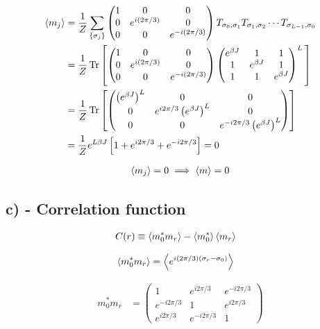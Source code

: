 \documentclass[reprint,english,notitlepage,aps,nobalancelastpage,nofootinbib]{revtex4-1}
\newcommand{\closed}[1]{\left(#1\right)}
\newcommand{\bracket}[1]{\left[#1\right]}
\newcommand{\sumstate}{\sum_{\{\sigma_j\}}}
\newcommand{\ebj}{e^{\beta J}}
\newcommand{\mj}{m_j}
\begin{document}
\begin{align*}
	\expval{\mj} &= \frac{1}{Z} \sumstate \begin{pmatrix}
		1 & 0 & 0 \\
		0 & e^{i(2\pi/3)} & 0 \\ 
		0 & 0 & e^{-i(2\pi/3)}
	\end{pmatrix} T_{\sigma_0,\sigma_1} T_{\sigma_1,\sigma_2}\cdots T_{\sigma_{L-1},\sigma_0} \\ 
	&= \frac{1}{Z} \Tr \bracket{ \begin{pmatrix}
		1 & 0 & 0 \\
		0 & e^{i(2\pi/3)} & 0 \\ 
		0 & 0 & e^{-i(2\pi/3)}
	\end{pmatrix} 
	\begin{pmatrix}
		\ebj & 1 & 1 \\ 
		1 & \ebj & 1 \\
		1 & 1 & \ebj
	\end{pmatrix}^L\,	} \\ 
	&= \frac{1}{Z} \Tr \bracket{ 
	\begin{pmatrix}
		\closed{\ebj}^L & 0 & 0 \\ 
		0 & e^{i2\pi/3}\closed{\ebj}^L & 0 \\ 
		0 & 0 & e^{-i2\pi/3}\closed{\ebj}^L
	\end{pmatrix}
	} \\ 
	&= \frac{1}{Z} e^{L\beta J}\bracket{1 + e^{i2\pi/3} + e^{-i2\pi/3}} = 0
\end{align*}

\begin{align*}
	\expval{\mj}=0 \implies \expval{m} = 0
\end{align*}

\subsection*{c) - Correlation function}

\begin{align*}
	C(r) &\equiv \expval{m_0^* m_r} - \expval{m_0^*}\expval{m_r}
\end{align*}


\begin{align*}
	\expval{m_0^* m_r} &= \expval{e^{i(2\pi/3)(\sigma_r - \sigma_0)}}
\end{align*}

\begin{align*}
	m_0^* m_r &= \begin{pmatrix}
		1 & e^{i2\pi/3} & e^{-i2\pi/3} \\ 
		e^{-i2\pi/3} & 1 & e^{i2\pi/3} \\ 
		e^{i2\pi/3} & e^{-i2\pi/3} & 1
	\end{pmatrix}
\end{align*}
\end{document}
